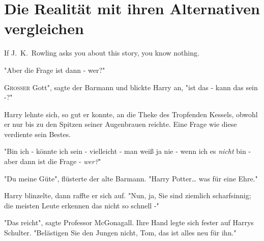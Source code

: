 \chapter{Die Realität mit ihren Alternativen vergleichen}

\begin{chapterOpeningAuthorNote}
If J.~K.~Rowling asks you about this story, you know nothing.
\end{chapterOpeningAuthorNote}

\begin{chapterOpeningQuote}
"Aber die Frage ist dann - wer?" 
\end{chapterOpeningQuote}

\lettrine[ante="]{G}{roßer} Gott", sagte der Barmann und blickte Harry an, "ist das - kann das sein -?" 

Harry lehnte sich, so gut er konnte, an die Theke des Tropfenden Kessels, obwohl er nur bis zu den Spitzen seiner Augenbrauen reichte. Eine Frage wie diese verdiente sein Bestes.

"Bin ich - könnte ich sein - vielleicht - man weiß ja nie - wenn ich es \emph{nicht} bin - aber dann ist die Frage - \emph{wer?}"

"Du meine Güte", flüsterte der alte Barmann. "Harry Potter… was für eine Ehre."

Harry blinzelte, dann raffte er sich auf. "Nun, ja, Sie sind ziemlich scharfsinnig; die meisten Leute erkennen das nicht so schnell -"

"Das reicht", sagte Professor McGonagall. Ihre Hand legte sich fester auf Harrys Schulter. "Belästigen Sie den Jungen nicht, Tom, das ist alles neu für ihn."

